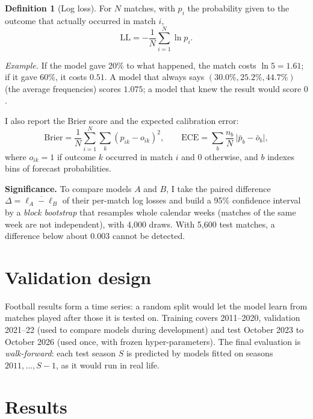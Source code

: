 \documentclass[11pt,a4paper]{article}
\theoremstyle{definition}
\newtheorem{definition}{Definition}[section]
\theoremstyle{remark}
\begin{document}
\begin{definition}[Log loss]
For $N$ matches, with $p_i$ the probability given to the outcome that actually occurred in match $i$,
\begin{equation}\mathrm{LL}=-\frac1N\sum_{i=1}^{N}\ln p_i .\end{equation}
\end{definition}

\emph{Example.} If the model gave 20\% to what happened, the match costs $\ln 5=1.61$; if it gave 60\%, it costs $0.51$.
A model that always says $(30.0\%,25.2\%,44.7\%)$ (the average frequencies) scores $1.075$; a model that knew the result would score $0$.

I also report the Brier score \cite{brier1950} and the expected calibration error:
\begin{equation}\mathrm{Brier}=\frac1N\sum_{i=1}^{N}\sum_{k}(p_{ik}-o_{ik})^2,\qquad \mathrm{ECE}=\sum_{b}\frac{n_b}{N}\,\bigl|\bar p_b-\bar o_b\bigr|,\end{equation}
where $o_{ik}=1$ if outcome $k$ occurred in match $i$ and $0$ otherwise, and $b$ indexes bins of forecast probabilities.

\textbf{Significance.} To compare models $A$ and $B$, I take the paired difference $\Delta=\overline{\ell_A-\ell_B}$ of their per-match log losses and build a 95\% confidence interval by a \emph{block bootstrap}
that resamples whole calendar weeks (matches of the same week are not independent), with 4{,}000 draws. With 5{,}600 test matches, a difference below about 0.003 cannot be detected.

\section{Validation design}

Football results form a time series: a random split would let the model learn from matches played after those it is tested on.
Training covers 2011--2020, validation 2021--22 (used to compare models during development) and test October 2023 to October 2026 (used once, with frozen hyper-parameters).
The final evaluation is \emph{walk-forward}: each test season $S$ is predicted by models fitted on seasons $2011,\dots,S-1$, as it would run in real life.

\section{Results}\label{sec:results}
\end{document}
